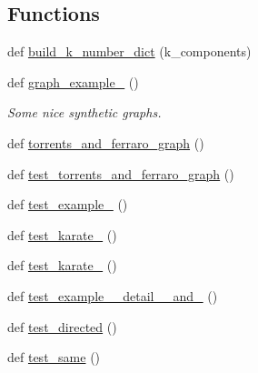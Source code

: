 \subsection*{Functions}
\begin{DoxyCompactItemize}
\item 
def \hyperlink{namespacenetworkx_1_1algorithms_1_1approximation_1_1tests_1_1test__kcomponents_a39f1bced464dc58b1b6f23cb83541210}{build\+\_\+k\+\_\+number\+\_\+dict} (k\+\_\+components)
\item 
def \hyperlink{namespacenetworkx_1_1algorithms_1_1approximation_1_1tests_1_1test__kcomponents_a7d6ac1f573884eb406cf1f0aea895b92}{graph\+\_\+example\+\_} ()
\begin{DoxyCompactList}\small\item\em Some nice synthetic graphs. \end{DoxyCompactList}\item 
def \hyperlink{namespacenetworkx_1_1algorithms_1_1approximation_1_1tests_1_1test__kcomponents_a5dcb803826c472d886b7eb54cb1ba8d9}{torrents\+\_\+and\+\_\+ferraro\+\_\+graph} ()
\item 
def \hyperlink{namespacenetworkx_1_1algorithms_1_1approximation_1_1tests_1_1test__kcomponents_adf8ccd5a386541a224388db2d5f97792}{test\+\_\+torrents\+\_\+and\+\_\+ferraro\+\_\+graph} ()
\item 
def \hyperlink{namespacenetworkx_1_1algorithms_1_1approximation_1_1tests_1_1test__kcomponents_ac7c11bef8d71e9818c29c54063f64a49}{test\+\_\+example\+\_} ()
\item 
def \hyperlink{namespacenetworkx_1_1algorithms_1_1approximation_1_1tests_1_1test__kcomponents_a3fc253fc96b2d615bb140cbb514284d9}{test\+\_\+karate\+\_} ()
\item 
def \hyperlink{namespacenetworkx_1_1algorithms_1_1approximation_1_1tests_1_1test__kcomponents_afd4a1cddc29650243bddd69664ff0de6}{test\+\_\+karate\+\_} ()
\item 
def \hyperlink{namespacenetworkx_1_1algorithms_1_1approximation_1_1tests_1_1test__kcomponents_a933ab62476e394cd4e97d14238dfec12}{test\+\_\+example\+\_\+\_\+detail\+\_\+\_\+and\+\_} ()
\item 
def \hyperlink{namespacenetworkx_1_1algorithms_1_1approximation_1_1tests_1_1test__kcomponents_a09027edc27d37074efc396a85cd9cc13}{test\+\_\+directed} ()
\item 
def \hyperlink{namespacenetworkx_1_1algorithms_1_1approximation_1_1tests_1_1test__kcomponents_af3cb32308cf9b817721b735d422ad974}{test\+\_\+same} ()
\end{DoxyCompactItemize}


